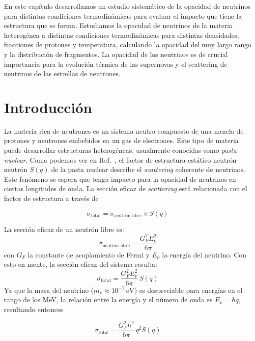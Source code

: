 En este capítulo desarrollamos un estudio sistemático de la opacidad de neutrinos para distintas condiciones termodinámicas para evaluar el impacto que tiene la estructura que se forma.
Estudiamos la opacidad de neutrinos de la materia heterogénea a distintas condiciones termodinámicas para distintas densidades, fracciones de protones y temperatura, calculando la opacidad del muy largo rango y la distribución de fragmentos.
La opacidad de los neutrinos es de crucial importancia para la evolución térmica de las supernovas y el scattering de neutrinos de las estrellas de neutrones.

\section{Introducción}
La materia rica de neutrones es un sistema neutro compuesto de una mezcla de protones y neutrones embebidos en un gas de electrones.
Este tipo de materia puede desarrollar estructuras heterogéneas, usualmente conocidas como \emph{pasta nuclear}.
Como podemos ver en Ref.~\cite{horowitz_nonuniform_2004, horowitz_neutrino-pasta_2004}, el factor de estructura estático neutrón-neutrón $S(q)$ de la pasta nuclear describe el \emph{scattering} coherente de neutrinos.
Este fenómeno se espera que tenga impacto para la opacidad de neutrinos en ciertas longitudes de onda.
La sección eficaz de \emph{scattering} está relacionada con el factor de estructura a través de

\begin{equation}
 \sigma_{\text{total}} = \sigma_{\text{neutrón libre}} \times S(q)
\end{equation}

La sección eficaz de un neutrón libre es:
\begin{equation}
\sigma_{\text{neutrón libre}} = \frac{G_F^2E_\nu^2}{6\pi}
\end{equation}
con $G_F$ la constante de acoplamiento de Fermi y $E_\nu$ la energía del neutrino.
Con esto en mente, la sección eficaz del sistema resulta:
\begin{equation}
\sigma_{\text{total}} = \frac{G_F^2E_\nu^2}{6\pi}\, S(q)
\label{eq:opac}
\end{equation}
Ya que la masa del neutrino ($m_\nu \approx 10^{-2}\,\text{eV}$) es despreciable para energías en el rango de los MeV, la relación entre la energía y el número de onda es $E_\nu = \hbar q$, resultando entonces

\begin{equation}
\sigma_{\text{total}} = \frac{G_F^2\hbar^2}{6\pi}\, q^2S(q)
\label{eq:opac}
\end{equation}

